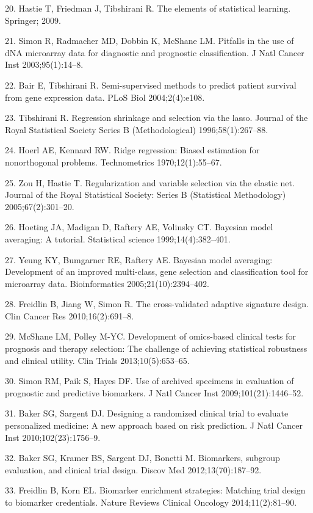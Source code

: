 \documentclass[11pt]{article}
\begin{document}
20. Hastie T, Friedman J, Tibshirani R. The elements of statistical
learning. Springer; 2009.

21. Simon R, Radmacher MD, Dobbin K, McShane LM. Pitfalls in the use of
dNA microarray data for diagnostic and prognostic classification. J Natl
Cancer Inst 2003;95(1):14--8.

22. Bair E, Tibshirani R. Semi-supervised methods to predict patient
survival from gene expression data. PLoS Biol 2004;2(4):e108.

23. Tibshirani R. Regression shrinkage and selection via the lasso.
Journal of the Royal Statistical Society Series B (Methodological)
1996;58(1):267--88.

24. Hoerl AE, Kennard RW. Ridge regression: Biased estimation for
nonorthogonal problems. Technometrics 1970;12(1):55--67.

25. Zou H, Hastie T. Regularization and variable selection via the
elastic net. Journal of the Royal Statistical Society: Series B
(Statistical Methodology) 2005;67(2):301--20.

26. Hoeting JA, Madigan D, Raftery AE, Volinsky CT. Bayesian model
averaging: A tutorial. Statistical science 1999;14(4):382--401.

27. Yeung KY, Bumgarner RE, Raftery AE. Bayesian model averaging:
Development of an improved multi-class, gene selection and
classification tool for microarray data. Bioinformatics
2005;21(10):2394--402.

28. Freidlin B, Jiang W, Simon R. The cross-validated adaptive signature
design. Clin Cancer Res 2010;16(2):691--8.

29. McShane LM, Polley M-YC. Development of omics-based clinical tests
for prognosis and therapy selection: The challenge of achieving
statistical robustness and clinical utility. Clin Trials
2013;10(5):653--65.

30. Simon RM, Paik S, Hayes DF. Use of archived specimens in evaluation
of prognostic and predictive biomarkers. J Natl Cancer Inst
2009;101(21):1446--52.

31. Baker SG, Sargent DJ. Designing a randomized clinical trial to
evaluate personalized medicine: A new approach based on risk prediction.
J Natl Cancer Inst 2010;102(23):1756--9.

32. Baker SG, Kramer BS, Sargent DJ, Bonetti M. Biomarkers, subgroup
evaluation, and clinical trial design. Discov Med 2012;13(70):187--92.

33. Freidlin B, Korn EL. Biomarker enrichment strategies: Matching trial
design to biomarker credentials. Nature Reviews Clinical Oncology
2014;11(2):81--90.
\end{document}
